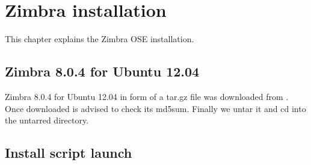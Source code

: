 

\chapter{Zimbra installation}
\label{chap:zimbra-installation}
This chapter explains the Zimbra OSE installation.

\section {Zimbra 8.0.4 for Ubuntu 12.04}
Zimbra 8.0.4 for Ubuntu 12.04 in form of a tar.gz file was downloaded from \cite{Zimbra8Download}.
Once downloaded is advised to check its md5sum. Finally we untar it and cd into the untarred directory.

\section {Install script launch}


